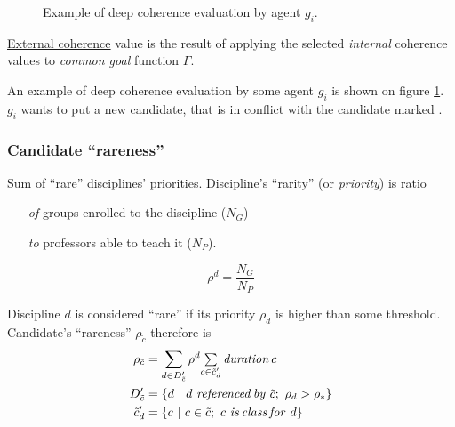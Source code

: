 \documentclass[../../header]{subfiles}
\begin{document}

\begin{figure}[H]
  \centering
  \resizebox{0.7\textwidth}{!}{
    
    }
  \caption[Example of deep coherence evaluation]
          {Example of deep coherence evaluation by agent $g_i$.}
  \label{fig:ConflictDeepCoherence}
\end{figure}
\newpage


\noindent
\underline{External coherence} value is the result of applying the selected
\emph{internal} coherence values to \emph{common goal} function $\Gamma$.

\medskip

\noindent
An example of deep coherence evaluation by some agent $g_i$ is shown on figure
\ref{fig:ConflictDeepCoherence}. $g_i$ wants to put a new candidate, that is
in conflict with the candidate marked .



\subsubsection{Candidate ``rareness''}
Sum of ``rare'' disciplines' priorities. Discipline's ``rarity'' (or
\emph{priority}) is ratio
\begin{itemize}
  \item[\textit{of}] groups enrolled to the discipline ($N_G$)
  \item[\textit{to}] professors able to teach it ($N_P$).
\end{itemize}

$$\rho^d = \dfrac{N_G}{N_P}$$

\medskip
\noindent
Discipline $d$ is considered ``rare'' if its priority $\rho_d$ is higher than
some threshold. \\
\noindent
Candidate's ``rareness'' $\rho_{\tilde{c}}$ therefore is
\begin{align*}
  \rho_{\tilde{c}} &= \sum\limits_{d \in D'_{\tilde{c}}}
        \rho^d \mathsmaller{ \sum\limits_{c \in \tilde{c}'_d}
                              \mathit{duration}\, c }\\
  D'_{\tilde{c}} &= \lbrace d ~|~ d ~\mathit{referenced\,by}~ \tilde{c};~
                                \rho_d > \rho_* \rbrace\\
  \tilde{c}'_d &= \lbrace c ~|~ c \in \tilde{c};~ c ~\mathit{is\,class\,for}~ d \rbrace
\end{align*}
\end{document}
